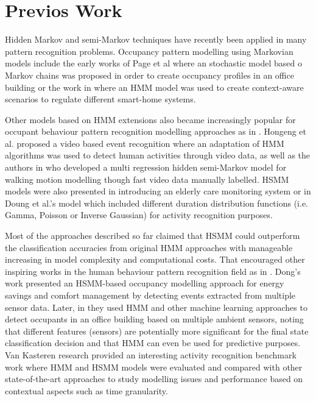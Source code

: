 \documentclass[conference]{IEEEtran}
\begin{document}
\section{Previos Work}
Hidden Markov and semi-Markov techniques have recently been applied in many pattern recognition problems. Occupancy pattern modelling using Markovian models include the early works of Page et al \cite{Page2008} where an stochastic model based o Markov chains was proposed in order to create occupancy profiles in an office building or the work in \cite{Si2005} where an HMM model was used to create context-aware scenarios to regulate different smart-home systems. 

Other models based on HMM extensions also became increasingly popular for occupant behaviour pattern recognition modelling approaches as in \cite{Yamagishi2006}. Hongeng et al.  \cite{Hongeng2004} proposed a video based event recognition where an adaptation of HMM algorithms was used to detect human activities through video data, as well as the authors in \cite{Yamazaki2005} who developed a multi regression hidden semi-Markov model for walking motion modelling though fast video data manually labelled. HSMM models were also presented in \cite{Pavel2006} introducing an elderly care monitoring system or in Doung et al.'s model\cite{Duong2006} which included different duration distribution functions (i.e. Gamma, Poisson or Inverse Gaussian) for activity recognition purposes. 

Most of the approaches described so far claimed that HSMM could outperform the classification accuracies from original HMM approaches with manageable increasing in model complexity and computational costs. That encouraged other inspiring works in the human behaviour pattern recognition field as in \cite{Dong2010b}\cite{Kasteren2011a}\cite{Dong2009a}. Dong's work \cite{Dong2009a} presented an HSMM-based occupancy modelling approach for energy savings and comfort management by detecting events extracted from multiple sensor data. Later, in \cite{Dong2010b} they used HMM and other machine learning approaches to detect occupants in an office building based on multiple ambient sensors, noting that different features (sensors) are potentially more significant for the final state classification decision and that HMM can even be used for predictive purposes. Van Kasteren research \cite{Kasteren2011a} provided an interesting activity recognition benchmark work where HMM and HSMM models were evaluated and compared with other state-of-the-art approaches to study modelling issues and performance based on contextual aspects such as time granularity. 
\end{document}
